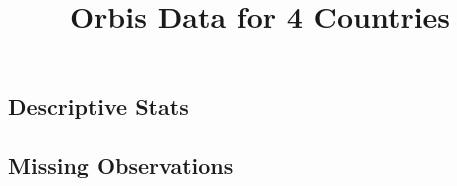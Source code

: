 \documentclass[12pt,notitlepage]{article}
\title{Orbis Data for 4 Countries}
\author{}
\date{}
\begin{document}
\maketitle

\subsection*{Descriptive Stats}

\begin{table}[!htpb]
    \centering
    \caption{Descriptive Statistics - Italy}
    \label{tab:my_label}
\end{table}

\begin{table}[!htpb]
    \centering
    \caption{Descriptive Statistics - France}
    \label{tab:my_label}
\end{table}

\begin{table}[!htpb]
    \centering
    \caption{Descriptive Statistics - Hungary}
    \label{tab:my_label}
\end{table}

\begin{table}[!htpb]
    \centering
    \caption{Descriptive Statistics - Czech Republic}
    \label{tab:my_label}
\end{table}
\pagebreak


\subsection*{Missing Observations}

\begin{table}[!htpb]
    \centering
    \caption{Missing Observations - Italy}
    \label{tab:my_label}
\end{table}
\end{document}
